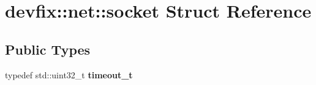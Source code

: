 \hypertarget{structdevfix_1_1net_1_1socket}{}\section{devfix\+:\+:net\+:\+:socket Struct Reference}
\label{structdevfix_1_1net_1_1socket}
\subsection*{Public Types}
\begin{DoxyCompactItemize}
\item 
\mbox{\label{structdevfix_1_1net_1_1socket_a80a3bf4cb7292bae31ea9c6575539c68}} 
typedef std\+::uint32\+\_\+t {\bfseries timeout\+\_\+t}
\end{DoxyCompactItemize}
